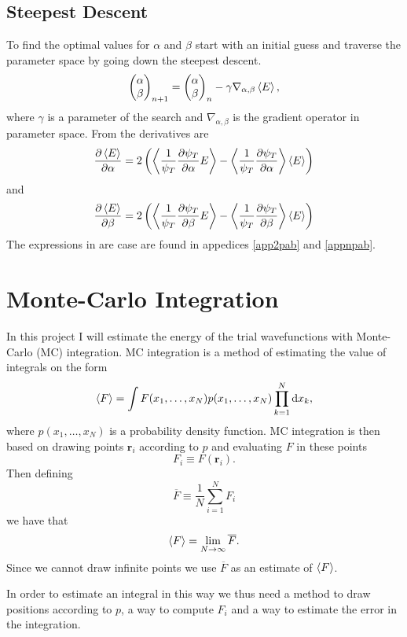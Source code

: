 \documentclass[a4paper,English,10pt]{article}
\newcommand{\bb}[1]{\boldsymbol{#1}}
\newcommand{\p}{\partial}
\newcommand{\dd}{\mathrm{d}}
\newcommand{\pddt}[2]{\frac{\p #1}{\p #2}}
\newcommand{\rar}{\rightarrow}
\newcommand{\be}{\begin{equation}}
\newcommand{\ee}{\end{equation}}
\newcommand{\f}{\frac}
\renewcommand{\bar}{\overline}
\renewcommand{\braket}{\Braket}
\begin{document}
\subsection{Steepest Descent}
To find the optimal values for $\alpha$ and $\beta$ start with an initial guess and traverse the parameter space by going down the steepest descent.
\be
\left(\begin{matrix}\alpha\\\beta\end{matrix}\right)_{n+1} =  \left(\begin{matrix}\alpha\\\beta\end{matrix}\right)_{n} - \gamma\nabla_{\alpha,\beta}\braket{E},
\ee
where $\gamma$ is a parameter of the search and $\nabla_{\alpha,\beta}$ is the gradient operator in parameter space.
From \cite{mortenbok} the derivatives are
\be
\pddt{\braket{E}}{\alpha} = 2\left(\braket{\f{1}{\psi_T}\pddt{\psi_T}{\alpha}E} - \braket{\f{1}{\psi_T}\pddt{\psi_T}{\alpha}}\braket{E}\right)
\ee
and 
\be
\pddt{\braket{E}}{\beta} = 2\left(\braket{\f{1}{\psi_T}\pddt{\psi_T}{\beta}E} - \braket{\f{1}{\psi_T}\pddt{\psi_T}{\beta} }\braket{E}\right)
\ee
The expressions in are case are found in appedices \ref{app2pab} and \ref{appnpab}.

\section{Monte-Carlo Integration}

In this project I will estimate the energy of the trial wavefunctions with Monte-Carlo (MC) integration.
MC integration is a method of estimating the value of integrals on the form
\be
\braket{F} = \int F(x_1,\ldots,x_N)p(x_1,\ldots,x_N)\prod_{k=1}^N\dd x_k, \label{MCI}
\ee
where \(p(x_1,\ldots,x_N)\) is a probability density function.
MC integration is then based on drawing points $\bb{r}_i$ according to $p$ and evaluating $F$ in these points
\be
F_i \equiv F(\bb{r}_i).
\ee
Then defining
\be
\bar{F} \equiv \f{1}{N}\sum_{i=1}^N F_i
\ee
we have that
\be
\braket{F} = \lim_{N\rar\infty}\bar{F}.
\ee
Since we cannot draw infinite points we use $\bar{F}$ as an estimate of $\braket{F}$.

In order to estimate an integral in this way we thus need a method to draw positions according to $p$,
a way to compute $F_i$ and a way to estimate the error in the integration.
\end{document}
